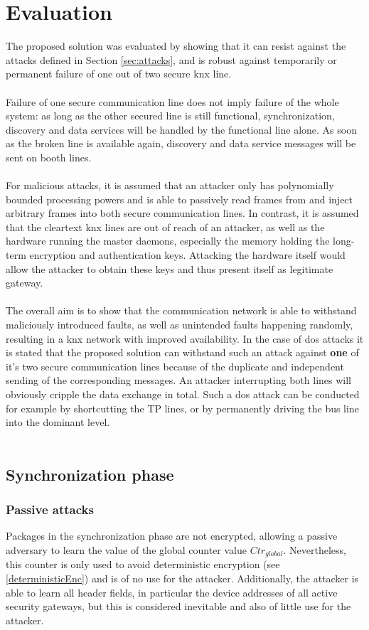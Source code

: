 \section{Evaluation}
The proposed solution was evaluated by showing that it can resist against the attacks defined in Section \ref{sec:attacks}, and is robust against temporarily or permanent 
failure of one out of two secure \gls{knx} line.
\\
\\
Failure of one secure communication line does not imply failure of the whole system: as long as the other secured line is still functional, synchronization, discovery and data services
will be handled by the functional line alone. As soon as the broken line is available again, discovery and data service messages will be sent on booth lines.
\\
\\
For malicious attacks, it is assumed that an attacker only has polynomially bounded processing
powers and is able to passively read frames from and inject arbitrary frames into both secure communication lines. In contrast, it is assumed that the cleartext \gls{knx} lines are out 
of reach of an attacker, as well as the hardware running the master daemons, especially the memory holding the long-term encryption and authentication keys. Attacking the hardware
itself would allow the attacker to obtain these keys and thus present itself as legitimate gateway.
\\
\\
The overall aim is to show that the communication network is able to withstand maliciously introduced faults, as well as unintended faults happening randomly, resulting
in a \gls{knx} network with improved availability. In the case of \gls{dos} attacks it is stated that the proposed solution can withstand such an attack against \textbf{one} of it's
two secure communication lines because of the duplicate and independent sending of the corresponding messages. An attacker interrupting both lines will obviously cripple the 
data exchange in total. Such a \gls{dos} attack can be conducted for example by shortcutting the \gls{TP} lines, or by permanently driving the bus line into the dominant level.
\\
\\
\subsection{Synchronization phase}
\subsubsection{Passive attacks}
Packages in the synchronization phase are not encrypted, allowing a passive adversary to learn the value of the global counter value $Ctr_{global}$. Nevertheless,
this counter is only used to avoid deterministic encryption (see \ref{deterministicEnc}) and is of no use for the attacker.
Additionally, the attacker is able to learn all header fields, in particular the device addresses of all active security gateways, but this is considered inevitable and also of little
use for the attacker.

